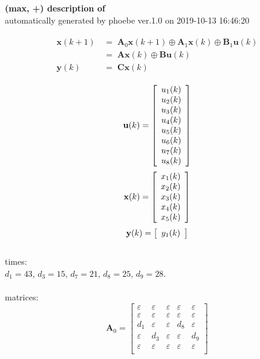 \documentclass[11pt, a4paper, fleqn]{article}
\begin{document}
\noindent
\textbf{(max, +) description of} \texttt{\currfilebase} \\
automatically generated by phoebe ver.1.0 on 2019-10-13 16:46:20 

\begin{align}\begin{split}
\mathbf{x}(k+1) & \, = \; \mathbf{A}_{0}\mathbf{x}(k+1) \oplus \mathbf{A}_{1}\mathbf{x}(k) \oplus \mathbf{B}_{1}\mathbf{u}(k)\\
& \, = \; \mathbf{Ax}(k) \oplus \mathbf{Bu}(k)\\
\mathbf{y}(k) & \, = \; \mathbf{Cx}(k)
\end{split}\end{align}

\begin{equation*}
\mathbf{u}(k) = 
\left[\begin{array}{*{20}c}
  u_1(k) \\
  u_2(k) \\
  u_3(k) \\
  u_4(k) \\
  u_5(k) \\
  u_6(k) \\
  u_7(k) \\
  u_8(k) \\
\end{array}\right]
\end{equation*}
\begin{equation*}
\mathbf{x}(k) = 
\left[\begin{array}{*{20}c}
  x_1(k) \\
  x_2(k) \\
  x_3(k) \\
  x_4(k) \\
  x_5(k) \\
\end{array}\right]
\end{equation*}
\begin{equation*}
\mathbf{y}(k) = 
\left[\begin{array}{*{20}c}
  y_1(k) \\
\end{array}\right]
\end{equation*}
\noindent\\
times:\\
$d_1 = 43$, $d_3 = 15$, $d_7 = 21$, $d_8 = 25$, $d_9 = 28$.\\
\\
matrices:
\begin{equation*}
\mathbf{A}_{0} = 
\left[\begin{array}{ ccccc }
\varepsilon	&\varepsilon	&\varepsilon	&\varepsilon	&\varepsilon\\
\varepsilon	&\varepsilon	&\varepsilon	&\varepsilon	&\varepsilon\\
d_1	&\varepsilon	&\varepsilon	&d_8	&\varepsilon\\
\varepsilon	&d_3	&\varepsilon	&\varepsilon	&d_9\\
\varepsilon	&\varepsilon	&\varepsilon	&\varepsilon	&\varepsilon\\
\end{array}\right]
\end{equation*}
\end{document}
